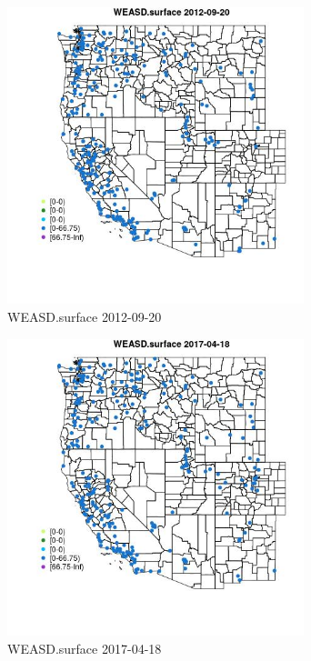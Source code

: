 \begin{figure} 
\centering  
\includegraphics[width=0.77\textwidth]{Code_Outputs/Report_ML_input_PM25_Step4_part_e_de_duplicated_aves_compiled_2019-05-14wNAs_MapObsWEASDsurface2012-09-20.jpg} 
\caption{\label{fig:Report_ML_input_PM25_Step4_part_e_de_duplicated_aves_compiled_2019-05-14wNAsMapObsWEASDsurface2012-09-20}WEASD.surface 2012-09-20} 
\end{figure} 
 

\clearpage 

\begin{figure} 
\centering  
\includegraphics[width=0.77\textwidth]{Code_Outputs/Report_ML_input_PM25_Step4_part_e_de_duplicated_aves_compiled_2019-05-14wNAs_MapObsWEASDsurface2017-04-18.jpg} 
\caption{\label{fig:Report_ML_input_PM25_Step4_part_e_de_duplicated_aves_compiled_2019-05-14wNAsMapObsWEASDsurface2017-04-18}WEASD.surface 2017-04-18} 
\end{figure} 
 

